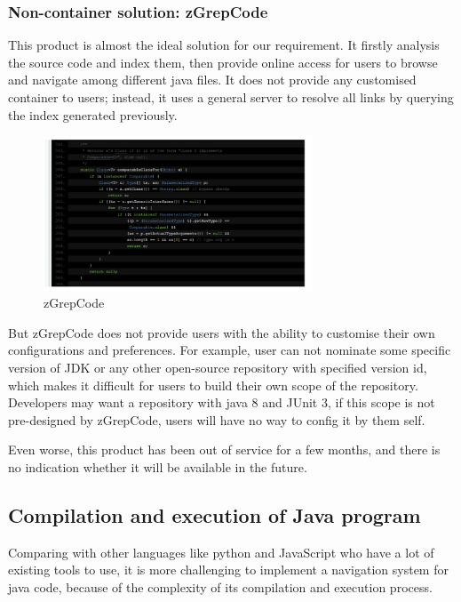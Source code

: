 \documentclass[runningheads]{llncs}
\begin{document}
\subsubsection{Non-container solution: zGrepCode\cite{zgrepcode}}
This product is almost the ideal solution for our requirement. It firstly analysis the source code and index them, then provide online access for users to browse and navigate among different java files. It does not provide any customised container to users; instead, it uses a general server to resolve all links by querying the index generated previously.

\begin{figure}[H]
	\centering
	\includegraphics[width=8cm]{pic/zGrepCode.png}
	\caption{zGrepCode}
	\label{zGrepCode}
\end{figure}

But zGrepCode does not provide users with the ability to customise their own configurations and preferences. For example, user can not nominate some specific version of JDK or any other open-source repository with specified version id, which makes it difficult for users to build their own scope of the repository. Developers may want a repository with java 8 and JUnit 3, if this scope is not pre-designed by zGrepCode, users will have no way to config it by them self.

Even worse, this product has been out of service for a few months, and there is no indication whether it will be available in the future.

\subsection{Compilation and execution of Java program}
Comparing with other languages like python and JavaScript who have a lot of existing tools to use, it is more challenging to implement a navigation system for java code, because of the complexity of its compilation and execution process.
\end{document}
